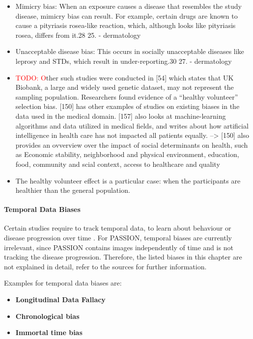\documentclass[12pt, a4paper, oneside]{book}   	%
\renewcommand{\todo}[1]{\textcolor{red}{TODO: #1}}
\newif\ifrawcitationactive
\newcommand{\rawcitationend}{\color{black}\rawcitationactivefalse}
\newcommand{\rawcitationusedend}{%
	\ifrawcitationactive
	\color{purple}  %
	\else
	\color{black}  %
	\fi
}
\begin{document}
\begin{itemize}
				\item  Mimicry bias: When an exposure causes a disease that resembles the study disease, mimicry bias can result. For example, certain drugs are known to cause a pityriasis rosea-like reaction, which, although looks like pityriasis rosea, differs from it.28 25.\autocite{Chakraborty_2024} - dermatology
				
				\item Unacceptable disease bias: This occurs in socially unacceptable diseases like leprosy and STDs, which result in under-reporting.30 27. \autocite{Chakraborty_2024} - dermatology
				
				\item \todo Other such studies were conducted in [54] which states that UK Biobank, a large and widely used genetic dataset, may not represent the sampling population. Researchers found evidence of a “healthy volunteer” selection bias. [150] has other examples of studies on existing biases in the data used in the medical domain. [157] also looks at machine-learning algorithms and data utilized in medical fields, and writes about how artificial intelligence in health care has not impacted all patients equally.\autocite{Mehrabi_2021} --> [150] also provides an ovverview over the impact of social determinants on health, such as Economic stability, neighborhood and physical environment, education, food, community and scial context, access to healthcare and quality
				\item The healthy volunteer effect is a particular case: when the participants are healthier than the general population. \autocite{Delgado-Rodríguez_2004}
				\rawcitationusedend
			\end{itemize}
			\rawcitationend
			
			\paragraph{Temporal Data Biases}
			Certain studies require to track temporal data, to learn about behaviour or disease progression over time \autocite{Mehrabi_2021}. For PASSION, temporal biases are currently irrelevant, since PASSION contains images independently of time and is not tracking the disease progression. Therefore, the listed biases in this chapter are not explained in detail, refer to the sources for further information.
			
			Examples for temporal data biases are:
			\begin{itemize}
				\item \textbf{Longitudinal Data Fallacy} \autocite{Mehrabi_2021}
				\item \textbf{Chronological bias} \autocite{Chakraborty_2024, c9, c13}
				\item \textbf{Immortal time bias} \autocite{Chakraborty_2024, c24, c20}
			\end{itemize}
			
\end{document}
